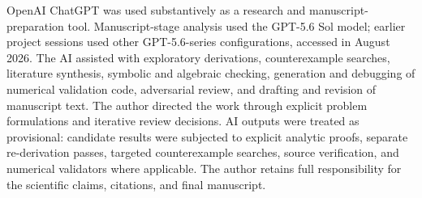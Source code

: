 OpenAI ChatGPT was used substantively as a research and manuscript-preparation tool. Manuscript-stage analysis used the GPT-5.6 Sol model; earlier project sessions used other GPT-5.6-series configurations, accessed in August 2026. The AI assisted with exploratory derivations, counterexample searches, literature synthesis, symbolic and algebraic checking, generation and debugging of numerical validation code, adversarial review, and drafting and revision of manuscript text. The author directed the work through explicit problem formulations and iterative review decisions. AI outputs were treated as provisional: candidate results were subjected to explicit analytic proofs, separate re-derivation passes, targeted counterexample searches, source verification, and numerical validators where applicable. The author retains full responsibility for the scientific claims, citations, and final manuscript.
